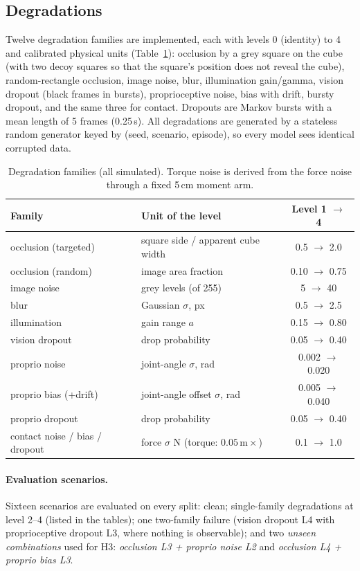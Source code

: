 \documentclass[11pt,a4paper]{article}
\begin{document}
\subsection{Degradations}
\label{sec:degradations}
Twelve degradation families are implemented, each with levels 0 (identity) to 4 and calibrated physical units (Table~\ref{tab:families}): occlusion by a grey square on the cube (with two decoy squares so that the square's position does not reveal the cube), random-rectangle occlusion, image noise, blur, illumination gain/gamma, vision dropout (black frames in bursts), proprioceptive noise, bias with drift, bursty dropout, and the same three for contact. Dropouts are Markov bursts with a mean length of 5 frames (0.25\,s). All degradations are generated by a stateless random generator keyed by (seed, scenario, episode), so every model sees identical corrupted data.

\begin{table}[t]
\centering\small
\begin{tabular}{llc}
\toprule
Family & Unit of the level & Level 1 $\to$ 4\\
\midrule
occlusion (targeted) & square side / apparent cube width & 0.5 $\to$ 2.0\\
occlusion (random) & image area fraction & 0.10 $\to$ 0.75\\
image noise & grey levels (of 255) & 5 $\to$ 40\\
blur & Gaussian $\sigma$, px & 0.5 $\to$ 2.5\\
illumination & gain range $a$ & 0.15 $\to$ 0.80\\
vision dropout & drop probability & 0.05 $\to$ 0.40\\
proprio noise & joint-angle $\sigma$, rad & 0.002 $\to$ 0.020\\
proprio bias (+drift) & joint-angle offset $\sigma$, rad & 0.005 $\to$ 0.040\\
proprio dropout & drop probability & 0.05 $\to$ 0.40\\
contact noise / bias / dropout & force $\sigma$ N (torque: $0.05\,\mathrm{m}\times$) & 0.1 $\to$ 1.0\\
\bottomrule
\end{tabular}
\caption{Degradation families (all simulated). Torque noise is derived from the force noise through a fixed 5\,cm moment arm.}
\label{tab:families}
\end{table}

\paragraph{Evaluation scenarios.} Sixteen scenarios are evaluated on every split: clean; single-family degradations at level 2--4 (listed in the tables); one two-family failure (vision dropout L4 with proprioceptive dropout L3, where nothing is observable); and two \emph{unseen combinations} used for H3: \emph{occlusion L3 + proprio noise L2} and \emph{occlusion L4 + proprio bias L3}.
\end{document}
